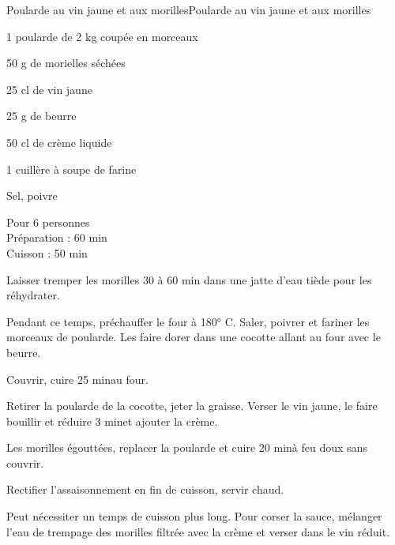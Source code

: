 \begin{recette}{Poularde au vin jaune et aux morilles}{Poularde au vin jaune et aux morilles}

\begin{ingredients}
1 poularde de 2 kg coupée en morceaux\par
50 g de morielles séchées\par
25 cl de vin jaune\par
25 g de beurre\par
50 cl de crème liquide\par
1 cuillère à soupe de farine\par
Sel, poivre\par
\end{ingredients}

\begin{infos}
Pour 6 personnes\\
Préparation : 60 min\\
Cuisson : 50 min\\
\end{infos}

\begin{etapes}
\item Laisser tremper les morilles 30 à 60 min dans une jatte d'eau tiède pour les réhydrater.
\item Pendant ce temps, préchauffer le four à 180° C. Saler, poivrer et fariner les morceaux de poularde. Les faire dorer dans une cocotte allant au four avec le beurre.
\item Couvrir, cuire 25 minau four.
\item Retirer la poularde de la cocotte, jeter la graisse. Verser le vin jaune, le faire bouillir et réduire 3 minet ajouter la crème.
\item Les morilles égouttées, replacer la poularde et cuire 20 minà feu doux sans couvrir.
\item Rectifier l'assaisonnement en fin de cuisson, servir chaud.
\end{etapes}

\begin{conseils}
Peut nécessiter un temps de cuisson plus long. Pour corser la sauce, mélanger l'eau de trempage des morilles filtrée avec la crème et verser dans le vin réduit.
\end{conseils}

\end{recette}